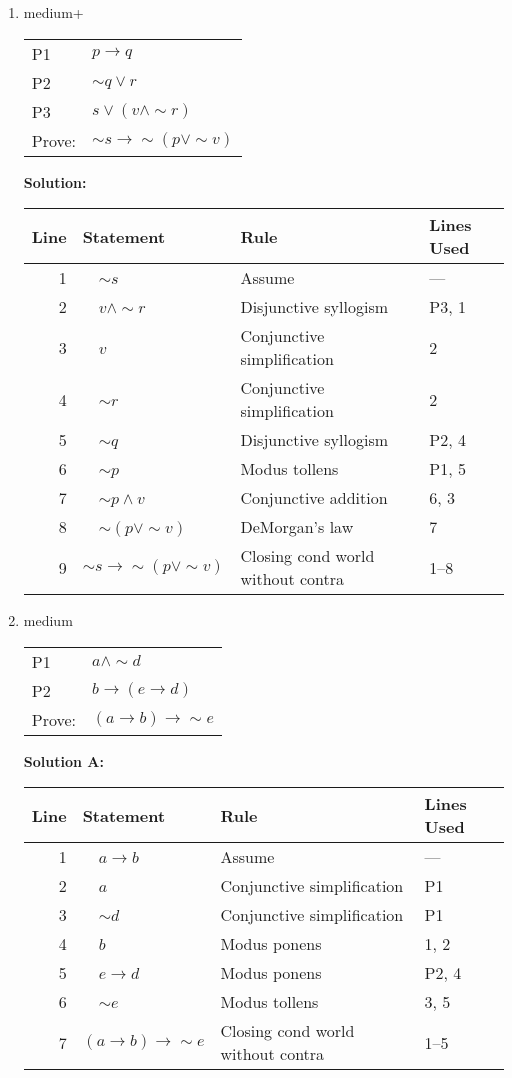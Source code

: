 \documentclass[10pt, letterpaper]{article}
\newcommand{\nott}{{\sim}}
\begin{document}
\begin{enumerate}
\newpage
\item medium+

\begin{tabular}[t]{ll}
P1 & $p \to q$ \\
P2 & $\nott q \lor r$ \\
P3 & $s \lor (v \land \nott r)$ \\ \hline
Prove: & $\nott s \to \nott (p \lor \nott v)$
\end{tabular}
                
\textbf{Solution:}

\begin{tabular}{|r|l|l|l|} \hline
Line & Statement & Rule & Lines Used \\ \hline
1 & \ \vline \ $\nott s$ & Assume & ---\\ \hline
2 & \ \vline \ $v \land \nott r$ & Disjunctive syllogism & P3, 1\\ \hline
3 & \ \vline \ $v $ & Conjunctive simplification & 2\\ \hline
4 & \ \vline \ $\nott r$ & Conjunctive simplification & 2\\ \hline
5 & \ \vline \ $\nott q$ & Disjunctive syllogism & P2, 4\\ \hline
6 & \ \vline \ $\nott p$ & Modus tollens & P1, 5\\ \hline
7 & \ \vline \ $\nott p \land v$ & Conjunctive addition & 6, 3\\ \hline
8 & \ \vline \ $\nott (p \lor \nott v)$ & DeMorgan's law & 7\\ \hline
9 & $\nott s \to \nott (p \lor \nott v)$ & Closing cond world without contra & 1--8\\ \hline
\end{tabular}

\newpage
\item medium

\begin{tabular}[t]{ll}
P1 & $a \land \nott d$ \\
P2 & $b \to (e \to d)$ \\ \hline
Prove: & $(a \to b) \to \nott e$
\end{tabular}

\textbf{Solution A:}

\begin{tabular}{|r|l|l|l|} \hline
Line & Statement & Rule & Lines Used \\ \hline
1 & \ \vline \ $a \to b$ & Assume & ---\\ \hline
2 & \ \vline \ $a$ & Conjunctive simplification & P1\\ \hline
3 & \ \vline \ $\nott d$ & Conjunctive simplification & P1\\ \hline
4 & \ \vline \ $b$ & Modus ponens & 1, 2\\ \hline
5 & \ \vline \ $e \to d$ & Modus ponens & P2, 4\\ \hline
6 & \ \vline \ $\nott e$ & Modus tollens & 3, 5\\ \hline
7 & $(a \to b) \to \nott e$ & Closing cond world without contra & 1--5 \\ \hline
\end{tabular}


\end{enumerate}
\end{document}
